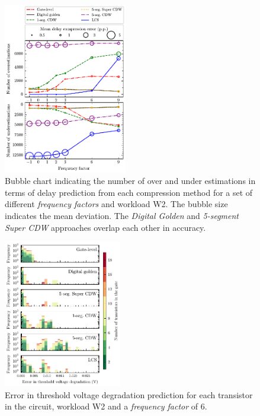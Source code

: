 \begin{figure}[!t]
    \includegraphics[width=0.48\textwidth,trim={0 0 0 0},clip]{images/ch2/delay_error_frequency_dependence.pdf}
    \caption{Bubble chart indicating the number of over and under estimations in terms of delay prediction from each compression method for a set of different \textit{frequency factors} and workload W2. The bubble size indicates the mean deviation. The \textit{Digital Golden} and \textit{5-segment Super CDW} approaches overlap each other in accuracy.}
    \label{fig:delay_error_frequency_dependence}
\end{figure}
\begin{figure}[!t]
    \includegraphics[width=0.46\textwidth,trim={0 0 0 1mm},clip]{images/ch2/absolute_error_histogram_plot_tau6.pdf}
    \caption{Error in threshold voltage degradation prediction for each transistor in the circuit, workload W2 and a \textit{frequency factor} of 6.}
    \label{fig:cellwise error tau6}
\end{figure}
